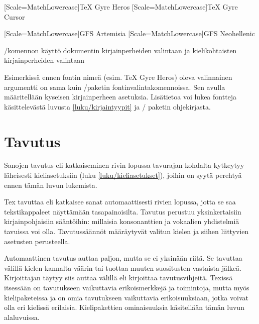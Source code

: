 \begin{esimerkki*}

\begin{koodilohko}
[Scale=MatchLowercase]{TeX Gyre Heros}
[Scale=MatchLowercase]{TeX Gyre Cursor}

[Scale=MatchLowercase]{GFS Artemisia}
[Scale=MatchLowercase]{GFS Neohellenic}
\end{koodilohko}
  \caption{\-/komennon käyttö dokumentin
    kirjainperheiden valintaan ja kielikohtaisten kirjainperheiden
    valintaan}
  \label{esim/babelfont}
\end{esimerkki*}

Esimerkissä ennen fontin nimeä (esim. TeX Gyre Heros) oleva valinnainen
argumentti on sama kuin \-/paketin
fontinvalintakomennoissa. Sen avulla määritellään kyseisen
kirjainperheen asetuksia. Lisätietoa voi lukea fontteja käsittelevästä
luvusta \ref{luku/kirjaintyypit} ja \-/ paketin
ohjekirjasta.

\section{Tavutus}
\label{luku/tavutus}

Sanojen tavutus eli katkaiseminen rivin lopussa tavurajan kohdalta
kytkeytyy läheisesti kieliasetuksiin (luku \ref{luku/kieliasetukset}),
joihin on syytä perehtyä ennen tämän luvun lukemista.

Tex tavuttaa eli katkaisee sanat automaattisesti rivien lopussa, jotta
se saa tekstikappaleet näyttämään tasapainoisilta. Tavutus perustuu
yksinkertaisiin kirjainpohjaisiin sääntöihin: millaisia konsonanttien ja
vokaalien yhdistelmiä tavuissa voi olla. Tavutussäännöt määräytyvät
valitun kielen ja siihen liittyvien asetusten perusteella.

Automaattinen tavutus auttaa paljon, mutta se ei yksinään riitä. Se
tavuttaa välillä kielen kannalta väärin tai tuottaa muuten suositusten
vastaista jälkeä. Kirjoittajan täytyy siis auttaa välillä eli kirjoittaa
tavutusvihjeitä. Texissä itsessään on tavutukseen vaikuttavia
erikoismerkkejä ja toimintoja, mutta myös kielipaketeissa
 ja  on omia tavutukseen vaikuttavia
erikoisuuksiaan, jotka voivat olla eri kielissä erilaisia.
Kielipakettien ominaisuuksia käsitellään tämän luvun alaluvuissa.

